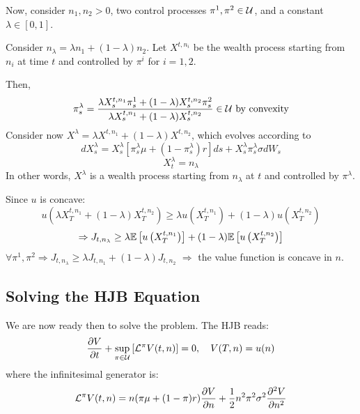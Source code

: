 Now, consider $n_1, n_2 > 0$, two control processes $\pi^1, \pi^2 \in \mathcal{U}$, and a constant $\lambda \in [0,1]$.

Consider $n_\lambda = \lambda n_1 + (1-\lambda) n_2$. Let $X^{t,n_i}$ be the wealth process starting from $n_i$ at time $t$ and controlled by $\pi^i$ for $i=1,2$.

Then,
\begin{equation*}
    \pi_s^\lambda = \frac{\lambda X_s^{t,n_1} \pi_s^1 + (1-\lambda) X_s^{t,n_2} \pi_s^2}{\lambda X_s^{t,n_1} + (1-\lambda) X_s^{t,n_2}} \in \mathcal{U} \text{ by convexity}
\end{equation*}
Consider now $X^\lambda = \lambda X^{t,n_1} + (1-\lambda) X^{t,n_2}$, which evolves according to
\begin{equation*}
    dX_s^\lambda = X_s^\lambda \left[ \pi_s^\lambda \mu + (1-\pi_s^\lambda) r \right] ds + X_s^\lambda \pi_s^\lambda \sigma dW_s
\end{equation*}
\begin{equation*}
    X_t^\lambda = n_\lambda
\end{equation*}
In other words, $X^\lambda$ is a wealth process starting from $n_\lambda$ at $t$ and controlled by $\pi^\lambda$.

Since $u$ is concave:
\begin{equation*}
    u \left( \lambda X_T^{t,n_1} + (1-\lambda) X_T^{t,n_2} \right) \geq \lambda u \left( X_T^{t,n_1} \right) + (1-\lambda) u \left( X_T^{t,n_2} \right)
\end{equation*}
\begin{equation*}
    \Rightarrow J_{t,n_\lambda} \geq \lambda \mathbb E \left[ u \left( X_T^{t,n_1} \right) \right] + (1-\lambda) \mathbb E \left[ u \left( X_T^{t,n_2} \right) \right]
\end{equation*}
$\forall \pi^1, \pi^2 \Rightarrow J_{t,n_\lambda} \geq \lambda J_{t,n_1} + (1-\lambda) J_{t,n_2}$
$\Rightarrow$ the value function is concave in $n$.

\subsection*{Solving the HJB Equation}

We are now ready then to solve the problem. The HJB reads:
\begin{equation*}
    \frac{\partial V}{\partial t} + \sup_{\pi \in \mathcal{U}} \left[ \mathcal{L}^\pi V(t,n) \right] = 0, \quad V(T,n) = u(n)
\end{equation*}
where the infinitesimal generator is:
\begin{equation*}
    \mathcal{L}^\pi V(t,n) = n(\pi \mu + (1-\pi) r) \frac{\partial V}{\partial n} + \frac{1}{2} n^2 \pi^2 \sigma^2 \frac{\partial^2 V}{\partial n^2}
\end{equation*}

